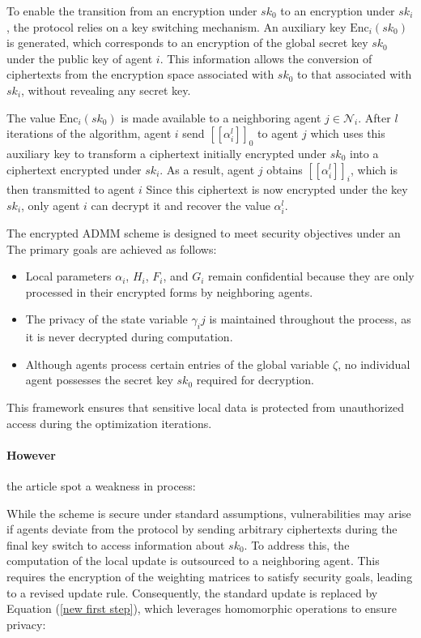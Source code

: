 \documentclass[10pt,english]{article}
\begin{document}
To enable the transition from an encryption under $sk_0$ to an encryption under $sk_i$, the protocol relies on a key switching mechanism. An auxiliary key $\mathrm{Enc}_i(sk_0)$ is generated, which corresponds to an encryption of the global secret key $sk_0$ under the public key of agent $i$. 
This information allows the conversion of ciphertexts from the encryption space associated with $sk_0$ to that associated with $sk_i$, without revealing any secret key.

The value $\mathrm{Enc}_i(sk_0)$ is made available to a neighboring agent $j \in \mathcal{N}_i$. 
After $l$ iterations of the algorithm, agent $i$ send $[\![\alpha_i^l]\!]_0$ to agent $j$ which uses this auxiliary key to transform a ciphertext initially encrypted under $sk_0$ into a ciphertext encrypted under $sk_i$. 
As a result, agent $j$ obtains $[\![\alpha_i^l]\!]_i$, which is then transmitted to agent $i$ Since this ciphertext is now encrypted under the key $sk_i$, only agent $i$ can decrypt it and recover the value $\alpha_i^l$.

The encrypted ADMM scheme is designed to meet security objectives under an The primary goals are achieved as follows:
\begin{itemize}
    \item Local parameters $\alpha_i$, $H_i$, $F_i$, and $G_i$ remain confidential because they are only processed in their encrypted forms by neighboring agents.
    \item The privacy of the state variable $\gamma_ij$ is maintained throughout the process, as it is never decrypted during computation.
    \item Although agents process certain entries of the global variable $\zeta$, no individual agent possesses the secret key $sk_0$ required for decryption. 
\end{itemize}
This framework ensures that sensitive local data is protected from unauthorized access during the optimization iterations.

\paragraph{However} the article spot a weakness in process: 

While the scheme is secure under standard assumptions, vulnerabilities may arise if agents deviate from the protocol by sending arbitrary ciphertexts during the final key switch to access information about $sk_0$. To address this, the computation of the local update is outsourced to a neighboring agent. This requires the encryption of the weighting matrices to satisfy security goals, leading to a revised update rule. Consequently, the standard update is replaced by Equation (\ref{new first step}), which leverages homomorphic operations to ensure privacy:
\end{document}
